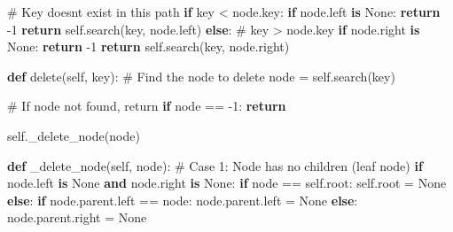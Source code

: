\documentclass[
  nswissgerman,
  a4paper,
  DIV=11,
  numbers=noendperiod,
  ngerman]{scrreprt}
\newenvironment{Shaded}{\begin{snugshade}}{\end{snugshade}}
\newcommand{\CommentTok}[1]{\textcolor[rgb]{0.37,0.37,0.37}{#1}}
\newcommand{\ControlFlowTok}[1]{\textcolor[rgb]{0.00,0.23,0.31}{\textbf{#1}}}
\newcommand{\DecValTok}[1]{\textcolor[rgb]{0.68,0.00,0.00}{#1}}
\newcommand{\KeywordTok}[1]{\textcolor[rgb]{0.00,0.23,0.31}{\textbf{#1}}}
\newcommand{\NormalTok}[1]{\textcolor[rgb]{0.00,0.23,0.31}{#1}}
\newcommand{\OperatorTok}[1]{\textcolor[rgb]{0.37,0.37,0.37}{#1}}
\newcommand{\VariableTok}[1]{\textcolor[rgb]{0.07,0.07,0.07}{#1}}
\begin{document}
\begin{Shaded}
\begin{Highlighting}[numbers=left,,]
        \CommentTok{\# Key doesn\textquotesingle{}t exist in this path}
        \ControlFlowTok{if}\NormalTok{ key }\OperatorTok{\textless{}}\NormalTok{ node.key:}
            \ControlFlowTok{if}\NormalTok{ node.left }\KeywordTok{is} \VariableTok{None}\NormalTok{:}
                \ControlFlowTok{return} \OperatorTok{{-}}\DecValTok{1}
            \ControlFlowTok{return} \VariableTok{self}\NormalTok{.search(key, node.left)}
        \ControlFlowTok{else}\NormalTok{:  }\CommentTok{\# key \textgreater{} node.key}
            \ControlFlowTok{if}\NormalTok{ node.right }\KeywordTok{is} \VariableTok{None}\NormalTok{:}
                \ControlFlowTok{return} \OperatorTok{{-}}\DecValTok{1}
            \ControlFlowTok{return} \VariableTok{self}\NormalTok{.search(key, node.right)}

    \KeywordTok{def}\NormalTok{ delete(}\VariableTok{self}\NormalTok{, key):}
        \CommentTok{\# Find the node to delete}
\NormalTok{        node }\OperatorTok{=} \VariableTok{self}\NormalTok{.search(key)}
        
        \CommentTok{\# If node not found, return}
        \ControlFlowTok{if}\NormalTok{ node }\OperatorTok{==} \OperatorTok{{-}}\DecValTok{1}\NormalTok{:}
            \ControlFlowTok{return}
        
        \VariableTok{self}\NormalTok{.\_delete\_node(node)}
        
    \KeywordTok{def}\NormalTok{ \_delete\_node(}\VariableTok{self}\NormalTok{, node):}
        \CommentTok{\# Case 1: Node has no children (leaf node)}
        \ControlFlowTok{if}\NormalTok{ node.left }\KeywordTok{is} \VariableTok{None} \KeywordTok{and}\NormalTok{ node.right }\KeywordTok{is} \VariableTok{None}\NormalTok{:}
            \ControlFlowTok{if}\NormalTok{ node }\OperatorTok{==} \VariableTok{self}\NormalTok{.root:}
                \VariableTok{self}\NormalTok{.root }\OperatorTok{=} \VariableTok{None}
            \ControlFlowTok{else}\NormalTok{:}
                \ControlFlowTok{if}\NormalTok{ node.parent.left }\OperatorTok{==}\NormalTok{ node:}
\NormalTok{                    node.parent.left }\OperatorTok{=} \VariableTok{None}
                \ControlFlowTok{else}\NormalTok{:}
\NormalTok{                    node.parent.right }\OperatorTok{=} \VariableTok{None}
        

\end{Highlighting}
\end{Shaded}
\end{document}
